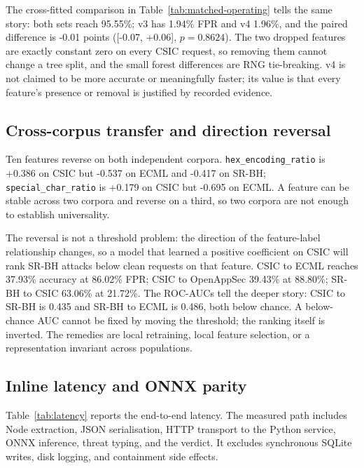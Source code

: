 \documentclass[preprint,11pt]{elsarticle}
\begin{document}
The cross-fitted comparison in Table~\ref{tab:matched-operating} tells the same story: both sets
reach 95.55\%; v3 has 1.94\% FPR and v4 1.96\%, and the paired
difference is -0.01 points ({[}-0.07, +0.06{]}, \(p=0.8624\)). The two
dropped features are exactly constant zero on every CSIC request, so
removing them cannot change a tree split, and the small forest
differences are RNG tie-breaking. v4 is not claimed to be more accurate
or meaningfully faster; its value is that every feature's presence or
removal is justified by recorded evidence.

\subsection{Cross-corpus transfer and direction
reversal}\label{cross-corpus-transfer-and-direction-reversal}

Ten features reverse on both independent corpora.
\texttt{hex\_\allowbreak{}encoding\_\allowbreak{}ratio} is +0.386 on CSIC but -0.537 on ECML and
-0.417 on SR-BH; \texttt{special\_\allowbreak{}char\_\allowbreak{}ratio} is +0.179 on CSIC but
-0.695 on ECML. A feature can be stable across two corpora and reverse
on a third, so two corpora are not enough to establish universality.

The reversal is not a threshold problem: the direction of the
feature-label relationship changes, so a model that learned a positive
coefficient on CSIC will rank SR-BH attacks below clean requests on that
feature. CSIC to ECML reaches 37.93\% accuracy at 86.02\% FPR; CSIC to
OpenAppSec 39.43\% at 88.80\%; SR-BH to CSIC 63.06\% at 21.72\%. The
ROC-AUCs tell the deeper story: CSIC to SR-BH is 0.435 and SR-BH to ECML
is 0.486, both below chance. A below-chance AUC cannot be fixed by
moving the threshold; the ranking itself is inverted. The remedies are
local retraining, local feature selection, or a representation invariant
across populations.

\subsection{Inline latency and ONNX
parity}\label{inline-latency-and-onnx-parity}

Table~\ref{tab:latency} reports the end-to-end latency. The measured path includes Node
extraction, JSON serialisation, HTTP transport to the Python service,
ONNX inference, threat typing, and the verdict. It excludes synchronous
SQLite writes, disk logging, and containment side effects.
\end{document}
